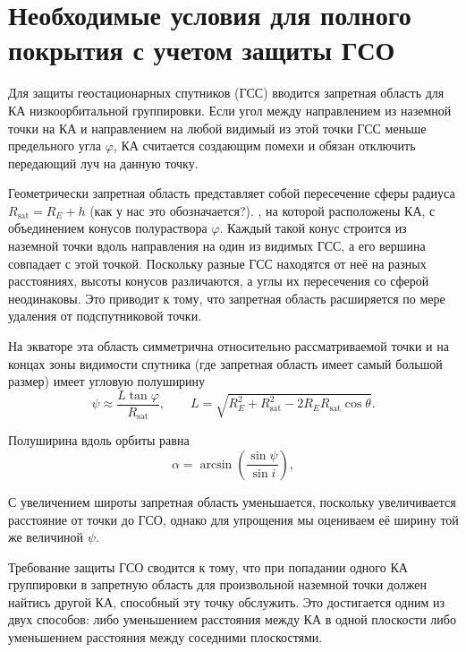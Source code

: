 \section{Необходимые условия для полного покрытия с учетом защиты ГСО}
\label{subsec:geo_protection}

% 
Для защиты геостационарных спутников (ГСС) вводится запретная область для 
КА низкоорбитальной группировки. Если угол между направлением из наземной 
точки на КА и направлением на любой видимый из этой точки ГСС меньше предельного 
угла $\varphi$, КА считается создающим помехи и обязан отключить передающий 
луч на данную точку.

Геометрически запретная область представляет собой пересечение сферы 
радиуса $R_{\text{sat}} = R_E + h$ 
(как у нас это обозначается?).
, на которой расположены КА, с 
объединением конусов полураствора $\varphi$. Каждый такой конус строится 
из наземной точки вдоль направления на один из видимых ГСС, а его вершина 
совпадает с этой точкой. Поскольку разные ГСС находятся от неё на разных 
расстояниях, высоты конусов различаются, а углы их пересечения со сферой 
неодинаковы. Это приводит к тому, что запретная область расширяется по мере 
удаления от подспутниковой точки. 

На экваторе эта область симметрична относительно рассматриваемой 
точки и на концах зоны видимости спутника 
(где запретная область имеет самый большой размер) 
имеет угловую полуширину
\begin{equation}
\psi \approx \frac{L \tan\varphi}{R_{\text{sat}}},
\qquad
L = \sqrt{R_E^2 + R_{\text{sat}}^2 - 2 R_E R_{\text{sat}} \cos\theta}.
\label{eq:psi}
\end{equation}

Полуширина вдоль орбиты равна
\begin{equation}
    \alpha =
    \arcsin\!\left(\frac{\sin\psi}{\sin i}\right),
    \label{eq:inplane-alpha}
\end{equation}


С увеличением широты запретная область уменьшается, поскольку увеличивается 
расстояние от точки до ГСО, однако для упрощения мы оцениваем 
её ширину той же величиной $\psi$.

Требование защиты ГСО сводится к тому, что при 
попадании одного КА группировки в запретную область для произвольной 
наземной точки должен найтись другой КА, способный эту точку обслужить. 
Это достигается одним из двух способов: либо уменьшением расстояния 
между КА в одной плоскости либо уменьшением расстояния между соседними плоскостями.

